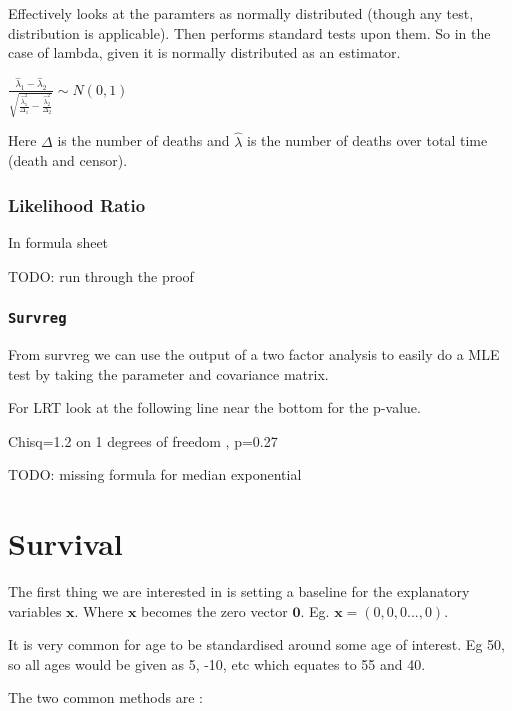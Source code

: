 \documentclass[
  letterpaper,
  DIV=11,
  numbers=noendperiod]{scrreprt}
\begin{document}
Effectively looks at the paramters as normally distributed (though any
test, distribution is applicable). Then performs standard tests upon
them. So in the case of lambda, given it is normally distributed as an
estimator.

\(\frac{\hat{\lambda}_1 - \hat{\lambda}_2}{\sqrt{\frac{\hat{\lambda}_1^2}{\Delta_1}-\frac{\hat{\lambda}_2^2}{\Delta_2}}} \sim N(0,1)\)

Here \(\Delta\) is the number of deaths and \(\hat{\lambda}\) is the
number of deaths over total time (death and censor).

\hypertarget{likelihood-ratio}{%
\subsection{Likelihood Ratio}\label{likelihood-ratio}}

In formula sheet

TODO: run through the proof

\hypertarget{survreg}{%
\subsection{\texorpdfstring{\texttt{Survreg}}{Survreg}}\label{survreg}}

From survreg we can use the output of a two factor analysis to easily do
a MLE test by taking the parameter and covariance matrix.

For LRT look at the following line near the bottom for the p-value.

Chisq=1.2 on 1 degrees of freedom , p=0.27

TODO: missing formula for median exponential


\hypertarget{survival-1}{%
\chapter{Survival}\label{survival-1}}

The first thing we are interested in is setting a baseline for the
explanatory variables \(\textbf{x}\). Where \(\textbf{x}\) becomes the
zero vector \(\textbf{0}\). Eg. \(\textbf{x} = (0,0,0...,0)\).

It is very common for age to be standardised around some age of
interest. Eg 50, so all ages would be given as 5, -10, etc which equates
to 55 and 40.

The two common methods are :
\end{document}
